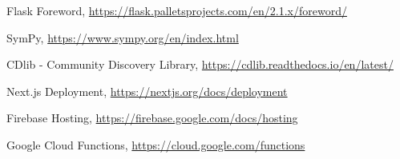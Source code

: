 \documentclass[a4paper,12pt]{report}
\begin{document}
\begin{thebibliography}{0}
Flask Foreword, \url{https://flask.palletsprojects.com/en/2.1.x/foreword/}

SymPy, \url{https://www.sympy.org/en/index.html}

CDlib - Community Discovery Library, \url{https://cdlib.readthedocs.io/en/latest/}

Next.js Deployment, \url{https://nextjs.org/docs/deployment}

Firebase Hosting, \url{https://firebase.google.com/docs/hosting}

Google Cloud Functions, \url{https://cloud.google.com/functions}
%
\end{thebibliography}
% 
\end{document}
